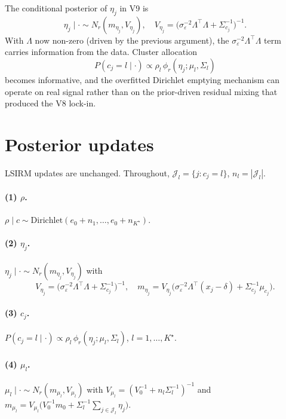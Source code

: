 \documentclass[11pt]{article}
\begin{document}
The conditional posterior of $\eta_j$ in V9 is
\[
\eta_j\mid\cdot\sim N_r(m_{\eta_j},V_{\eta_j}),
\quad
V_{\eta_j}=\bigl(\sigma_\varepsilon^{-2}\Lambda^\top\Lambda+\Sigma_{c_j}^{-1}\bigr)^{-1}.
\]
With $\Lambda$ now non-zero (driven by the previous argument), the
$\sigma_\varepsilon^{-2}\Lambda^\top\Lambda$ term carries information from
the data. Cluster allocation
\[
P(c_j=l\mid\cdot)\propto\rho_l\,\phi_r(\eta_j;\mu_l,\Sigma_l)
\]
becomes informative, and the overfitted Dirichlet emptying mechanism can
operate on real signal rather than on the prior-driven residual mixing
that produced the V8 lock-in.

\section{Posterior updates}

LSIRM updates are unchanged.
Throughout, $\mathcal{J}_l=\{j:c_j=l\}$, $n_l=|\mathcal{J}_l|$.

\paragraph{(1) $\rho$.}
$\rho\mid c\sim\mathrm{Dirichlet}(e_0+n_1,\dots,e_0+n_{K^\star})$.

\paragraph{(2) $\eta_j$.}
$\eta_j\mid\cdot\sim N_r(m_{\eta_j},V_{\eta_j})$ with
\begin{equation}
V_{\eta_j}=\bigl(\sigma_\varepsilon^{-2}\Lambda^\top\Lambda+\Sigma_{c_j}^{-1}\bigr)^{-1},
\quad
m_{\eta_j}=V_{\eta_j}\bigl(\sigma_\varepsilon^{-2}\Lambda^\top(x_j-\delta)+\Sigma_{c_j}^{-1}\mu_{c_j}\bigr).
\label{eq:eta-update-v9}
\end{equation}

\paragraph{(3) $c_j$.}
$P(c_j=l\mid\cdot)\propto\rho_l\,\phi_r(\eta_j;\mu_l,\Sigma_l)$, $l=1,\dots,K^\star$.

\paragraph{(4) $\mu_l$.}
$\mu_l\mid\cdot\sim N_r(m_{\mu_l},V_{\mu_l})$ with
$V_{\mu_l}=(V_0^{-1}+n_l\Sigma_l^{-1})^{-1}$ and
$m_{\mu_l}=V_{\mu_l}\bigl(V_0^{-1}m_0+\Sigma_l^{-1}\sum_{j\in\mathcal{J}_l}\eta_j\bigr)$.
\end{document}

